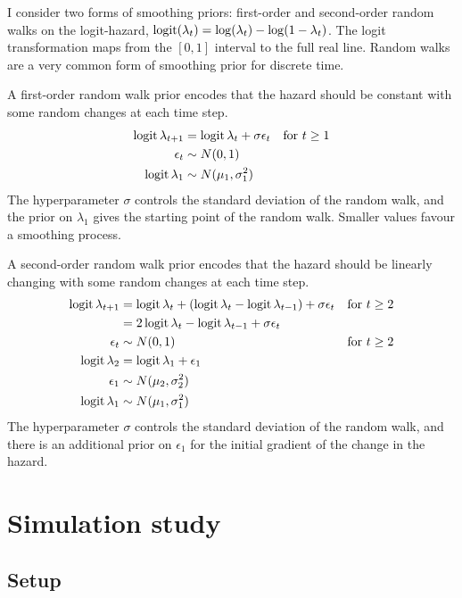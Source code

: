 \documentclass[thesis.tex]{subfiles}
\begin{document}
I consider two forms of smoothing priors: first-order and second-order random walks on the logit-hazard, $\operatorname{logit}(\lambda_t) = \log(\lambda_t) - \log(1 - \lambda_t)$.
The logit transformation maps from the $[0, 1]$ interval to the full real line.
Random walks are a very common form of smoothing prior for discrete time.

A first-order random walk prior encodes that the hazard should be constant with some random changes at each time step.
\begin{align}
  \operatorname{logit}\lambda_{t+1} &= \operatorname{logit}\lambda_t + \sigma \epsilon_t &\text{for $t \geq 1$} \\
  \epsilon_t &\sim N(0, 1) \\
  \operatorname{logit} \lambda_1 &\sim N(\mu_1, \sigma_1^2)
\end{align}
The hyperparameter $\sigma$ controls the standard deviation of the random walk, and the prior on $\lambda_1$ gives the starting point of the random walk.
Smaller values favour a smoothing process.

A second-order random walk prior encodes that the hazard should be linearly changing with some random changes at each time step.
\begin{align}
  \operatorname{logit}\lambda_{t+1}
  &= \operatorname{logit}\lambda_t + (\operatorname{logit}\lambda_t - \operatorname{logit}\lambda_{t-1}) + \sigma \epsilon_t &\text{for $t \geq 2$} \\
  &= 2\operatorname{logit}\lambda_t - \operatorname{logit}\lambda_{t-1} + \sigma \epsilon_t \\
  \epsilon_t &\sim N(0, 1) &\text{for $t \geq 2$}  \\
  \operatorname{logit}\lambda_2 &= \operatorname{logit}\lambda_1 + \epsilon_1 \\\
  \epsilon_1 &\sim N(\mu_2, \sigma_2^2) \\
  \operatorname{logit} \lambda_1 &\sim N(\mu_1, \sigma_1^2)
\end{align}
The hyperparameter $\sigma$ controls the standard deviation of the random walk, and there is an additional prior on $\epsilon_1$ for the initial gradient of the change in the hazard.

\section{Simulation study} \label{perf-test:sec:simulation-study}

\subsection{Setup}
\end{document}
